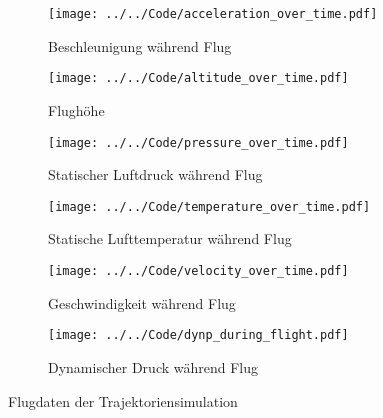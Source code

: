 \begin{figure}[H]
    \centering

    \begin{subfigure}{0.48\textwidth}
        \centering
        \texttt{[image: ../../Code/acceleration\_over\_time.pdf]}
        \caption{Beschleunigung während Flug}
        \label{fig:acceleration_over_time}
    \end{subfigure}
    \hfill
    \begin{subfigure}{0.48\textwidth}
        \centering
        \texttt{[image: ../../Code/altitude\_over\_time.pdf]}
        \caption{Flughöhe}
        \label{fig:altitude_over_time}
    \end{subfigure}

    \vspace{1em}

    \begin{subfigure}{0.48\textwidth}
        \centering
        \texttt{[image: ../../Code/pressure\_over\_time.pdf]}
        \caption{Statischer Luftdruck während Flug}
        \label{fig:pressure_over_time}
    \end{subfigure}
    \hfill
    \begin{subfigure}{0.48\textwidth}
        \centering
        \texttt{[image: ../../Code/temperature\_over\_time.pdf]}
        \caption{Statische Lufttemperatur während Flug}
        \label{fig:temperature_over_time}
    \end{subfigure}

    \vspace{1em}

    \begin{subfigure}{0.48\textwidth}
        \centering
        \texttt{[image: ../../Code/velocity\_over\_time.pdf]}
        \caption{Geschwindigkeit während Flug}
        \label{fig:velocity_over_time}
    \end{subfigure}
    \hfill
    \begin{subfigure}{0.48\textwidth}
        \centering
        \texttt{[image: ../../Code/dynp\_during\_flight.pdf]}
        \caption{Dynamischer Druck während Flug}
        \label{fig:dynp_over_time}
    \end{subfigure}

    \caption{Flugdaten der Trajektoriensimulation}\label{fig:flugdaten_trajektoriensimulation}
\end{figure}

